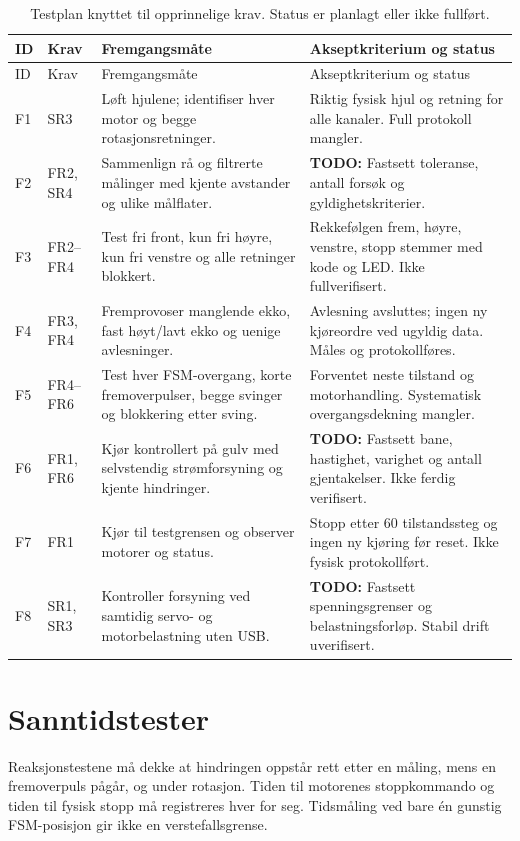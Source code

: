 \documentclass[a4paper,11pt,oneside]{report}
\newcommand{\todo}[1]{\textcolor{todocolor}{\textbf{TODO:} #1}}
\begin{document}
{\small
\begin{longtable}{@{}P{10mm}P{16mm}P{64mm}P{54mm}@{}}
\caption{Testplan knyttet til opprinnelige krav. Status er planlagt eller ikke fullført.}
\label{tab:testplan}\\
\toprule ID & Krav & Fremgangsmåte & Akseptkriterium og status\\\midrule
\endfirsthead
\toprule ID & Krav & Fremgangsmåte & Akseptkriterium og status\\\midrule
\endhead
F1 & SR3 & Løft hjulene; identifiser hver motor og begge rotasjonsretninger.
& Riktig fysisk hjul og retning for alle kanaler. Full protokoll mangler.\\
F2 & FR2, SR4 & Sammenlign rå og filtrerte målinger med kjente avstander og ulike målflater.
& \todo{Fastsett toleranse, antall forsøk og gyldighetskriterier.}\\
F3 & FR2--FR4 & Test fri front, kun fri høyre, kun fri venstre og alle retninger blokkert.
& Rekkefølgen frem, høyre, venstre, stopp stemmer med kode og LED. Ikke fullverifisert.\\
F4 & FR3, FR4 & Fremprovoser manglende ekko, fast høyt/lavt ekko og uenige avlesninger.
& Avlesning avsluttes; ingen ny kjøreordre ved ugyldig data. Måles og protokollføres.\\
F5 & FR4--FR6 & Test hver FSM-overgang, korte fremoverpulser, begge svinger og blokkering etter sving.
& Forventet neste tilstand og motorhandling. Systematisk overgangsdekning mangler.\\
F6 & FR1, FR6 & Kjør kontrollert på gulv med selvstendig strømforsyning og kjente hindringer.
& \todo{Fastsett bane, hastighet, varighet og antall gjentakelser.} Ikke ferdig verifisert.\\
F7 & FR1 & Kjør til testgrensen og observer motorer og status.
& Stopp etter 60 tilstandssteg og ingen ny kjøring før reset. Ikke fysisk protokollført.\\
F8 & SR1, SR3 & Kontroller forsyning ved samtidig servo- og motorbelastning uten USB.
& \todo{Fastsett spenningsgrenser og belastningsforløp.} Stabil drift uverifisert.\\
\bottomrule
\end{longtable}}

\section{Sanntidstester}
Reaksjonstestene må dekke at hindringen oppstår rett etter en måling, mens
en fremoverpuls pågår, og under rotasjon. Tiden til motorenes stoppkommando
og tiden til fysisk stopp må registreres hver for seg. Tidsmåling ved bare
én gunstig FSM-posisjon gir ikke en verstefallsgrense.
\end{document}
